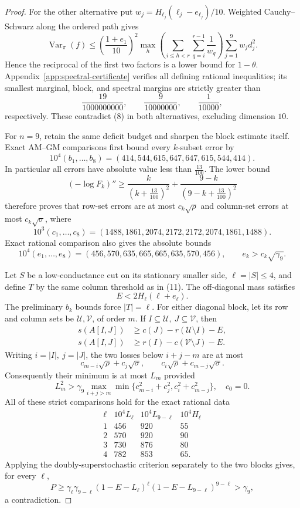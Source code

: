 \documentclass[11pt]{amsart}
\theoremstyle{definition}
\theoremstyle{remark}
\newenvironment{exacttable}
  {\begingroup\small
   \setlength{\arraycolsep}{4pt}%
   \renewcommand{\arraystretch}{1.12}}
  {\endgroup}
\begin{document}
\begin{proof}
For the other alternative put
\(w_j=H_{\ell_j}(\ell_j-e_{\ell_j})/10\).
Weighted Cauchy--Schwarz along the ordered path gives
\[
\operatorname{Var}_\pi(f)\leq
\left(\frac{1+e_1}{10}\right)^2
\max_h\left(\sum_{i\leq h<r}\sum_{q=i}^{r-1}\frac1{w_q}\right)
\sum_{j=1}^9w_jd_j^2.
\]
Hence the reciprocal of the first two factors is a lower bound for
\(1-\theta\).  Appendix~\ref{app:spectral-certificate} verifies all
defining rational inequalities; its
smallest marginal, block, and spectral margins are strictly greater than
\[
\frac{19}{1000000000},\qquad
\frac9{10000000},\qquad
\frac1{10000},
\]
respectively. These contradict (8) in both alternatives, excluding
dimension \(10\).

For \(n=9\), retain the same deficit budget and sharpen the block estimate
itself. Exact AM--GM comparisons first bound every \(k\)-subset error by
\[
10^4(b_1,\ldots,b_8)=(414,544,615,647,647,615,544,414).
\]
In particular all errors have absolute value less than
\(\frac{13}{100}\). The lower bound
\[
(-\log F_k)''\geq
\frac{k}{(k+\frac{13}{100})^2}+
\frac{9-k}{(9-k+\frac{13}{100})^2}
\]
therefore proves that row-set errors are at most \(c_k\sqrt\rho\) and
column-set errors at most \(c_k\sqrt\sigma\), where
\[
10^3(c_1,\ldots,c_8)
=(1488,1861,2074,2172,2172,2074,1861,1488).
\]
Exact rational comparison also gives the absolute bounds
\[
10^4(e_1,\ldots,e_8)
=(456,570,635,665,665,635,570,456),\qquad
e_k>c_k\sqrt{\gamma_9}.
\]

Let \(S\) be a low-conductance cut on its stationary smaller side,
\(\ell=|S|\leq4\), and define \(T\) by the same column threshold as in
(11). The off-diagonal mass satisfies
\[
 E<2H_\ell(\ell+e_\ell).
\]
The preliminary \(b_k\) bounds force \(|T|=\ell\). For either diagonal
block, let its row and column sets be \(\mathcal U,\mathcal V\), of order
\(m\). If \(I\subseteq\mathcal U,\ J\subseteq\mathcal V\), then
\[
\begin{split}
s(A[I,J])&\geq c(J)-r(\mathcal U\setminus I)-E,\\
s(A[I,J])&\geq r(I)-c(\mathcal V\setminus J)-E.
\end{split}
\]
Writing \(i=|I|,\ j=|J|\), the two losses below \(i+j-m\) are at most
\[
c_{m-i}\sqrt\rho+c_j\sqrt\sigma,\qquad
c_i\sqrt\rho+c_{m-j}\sqrt\sigma.
\]
Consequently their minimum is at most \(L_m\) provided
\[
L_m^2>\gamma_9
\max_{i+j>m}\min\{c_{m-i}^2+c_j^2,c_i^2+c_{m-j}^2\},
\quad c_0=0.
\]
All of these strict comparisons hold for the exact rational data
\begin{exacttable}
\[
\begin{array}{c|c|c|c}
\ell&10^4L_\ell&10^4L_{9-\ell}&10^4H_\ell\\ \hline
1&456&920&55\\
2&570&920&90\\
3&730&876&80\\
4&782&853&65 .
\end{array}
\]
\end{exacttable}
Applying the doubly-superstochastic criterion separately to the two blocks
gives, for every \(\ell\),
\[
P\geq\gamma_\ell\gamma_{9-\ell}
(1-E-L_\ell)^\ell(1-E-L_{9-\ell})^{9-\ell}>\gamma_9,
\]
a contradiction.


\end{proof}
\end{document}
